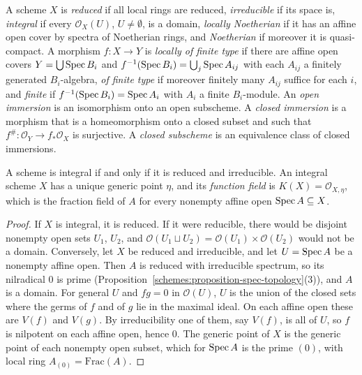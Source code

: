\begin{definition}\label{schemes:definition-properties}
A scheme $X$ is \emph{reduced} if all local rings are reduced, \emph{irreducible} if its space is, \emph{integral} if every $\mathcal{O}_X(U)$, $U \neq \emptyset$,
is a domain, \emph{locally Noetherian} if it has an affine open cover by spectra of Noetherian rings, and \emph{Noetherian} if moreover it is
quasi-compact. A morphism $f \colon X \to Y$ is \emph{locally of finite type} if there are affine open covers $Y = \bigcup\operatorname{Spec} B_i$ and
$f^{-1}(\operatorname{Spec} B_i) = \bigcup_j\operatorname{Spec} A_{ij}$ with each $A_{ij}$ a finitely generated $B_i$-algebra, \emph{of finite type} if moreover finitely many $A_{ij}$
suffice for each $i$, and \emph{finite} if $f^{-1}(\operatorname{Spec} B_i) = \operatorname{Spec} A_i$ with $A_i$ a finite $B_i$-module. An \emph{open immersion} is an isomorphism onto
an open subscheme. A \emph{closed immersion} is a morphism that is a homeomorphism onto a closed subset and such that
$f^\# \colon \mathcal{O}_Y \to f_*\mathcal{O}_X$ is surjective. A \emph{closed subscheme} is an equivalence class of closed immersions.
\end{definition}

\begin{proposition}\label{schemes:proposition-integral}
A scheme is integral if and only if it is reduced and irreducible. An integral scheme $X$ has a unique generic point $\eta$, and its
\emph{function field} is $K(X) = \mathcal{O}_{X,\eta}$, which is the fraction field of $A$ for every nonempty affine open $\operatorname{Spec} A \subseteq X$.
\end{proposition}

\begin{proof}
If $X$ is integral, it is reduced. If it were reducible, there would be disjoint nonempty open sets $U_1$, $U_2$, and
$\mathcal{O}(U_1 \sqcup U_2) = \mathcal{O}(U_1) \times \mathcal{O}(U_2)$ would not be a domain. Conversely, let $X$ be reduced and irreducible, and let
$U = \operatorname{Spec} A$ be a nonempty affine open. Then $A$ is reduced with irreducible spectrum, so its nilradical $0$ is prime
(Proposition~\ref{schemes:proposition-spec-topology}(3)), and $A$ is a domain. For general $U$ and $fg = 0$ in $\mathcal{O}(U)$, $U$ is the union of the
closed sets where the germs of $f$ and of $g$ lie in the maximal ideal. On each affine open these are $V(f)$ and $V(g)$. By irreducibility one of
them, say $V(f)$, is all of $U$, so $f$ is nilpotent on each affine open, hence $0$. The generic point of $X$ is the generic point of each nonempty
open subset, which for $\operatorname{Spec} A$ is the prime $(0)$, with local ring $A_{(0)} = \mathrm{Frac}(A)$.
\end{proof}

